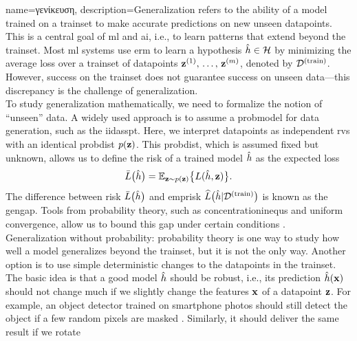 {name={\foreignlanguage{greek}{γενίκευση}}, 
	description={Generalization 
		refers to the ability of a \gls{model} trained on a \gls{trainset} to make accurate 
		\gls{prediction}s on new unseen \gls{datapoint}s. This is a central goal of \gls{ml} and \gls{ai}, i.e.,
		to learn patterns that extend beyond the \gls{trainset}. Most \gls{ml} systems 
		use \gls{erm} to learn a \gls{hypothesis} $\hat{h} \in \mathcal{H}$ by minimizing 
		the average \gls{loss} over a \gls{trainset} of \gls{datapoint}s ${\bf z}^{(1)}, \,\ldots, \,{\bf z}^{(m)}$, 
		denoted by $\mathcal{D}^{(\rm train)}$. However, success on the \gls{trainset} does not guarantee success on 
		unseen \gls{data}—this discrepancy is the challenge of generalization. \\ To study generalization 
		mathematically, we need to formalize the notion of ``unseen'' \gls{data}. A widely used 
		approach is to assume a \gls{probmodel} for \gls{data} generation, such as the \gls{iidasspt}. 
		Here, we interpret \gls{datapoint}s as independent \gls{rv}s with an identical 
		\gls{probdist} $p({\bf z})$. This \gls{probdist}, which is assumed fixed but unknown, 
		allows us to define the \gls{risk} of a trained \gls{model} $\hat{h}$ as the expected \gls{loss}
		\[
		\bar{L} \big( \hat{h} \big)=\mathbb{E}_{{\bf z} \sim p({\bf z})} \big\{ L(\hat{h}, {\bf z}) \big\}.
		\]
		The difference between \gls{risk} $\bar{L} \big( \hat{h} \big)$ and \gls{emprisk} $\widehat{L}\big(\hat{h}|\mathcal{D}^{(\rm train)}\big)$ 
		is known as the \gls{gengap}. Tools from \gls{probability} theory, such as \gls{concentrationinequ}s 
		and uniform \gls{convergence}, allow us to bound this gap under certain conditions \cite{ShalevMLBook}.\\
		Generalization without \gls{probability}: \Gls{probability} theory is one way to study how well a 
		\gls{model} generalizes beyond the \gls{trainset}, but it is not the only way. Another option is to use 
		simple deterministic changes to the \gls{datapoint}s in the \gls{trainset}. The basic idea is that a 
		good \gls{model} $\hat{h}$ should be robust, i.e., its \gls{prediction} $\hat{h}({\bf x})$ 
		should not change much if we slightly change the \gls{feature}s ${\bf x}$ of a \gls{datapoint} ${\bf z}$. 
		For example, an object detector trained on smartphone photos should still detect the object if a few 
		random pixels are masked \cite{OnePixelAttack}. Similarly, it should deliver the same result if we rotate 
}}
